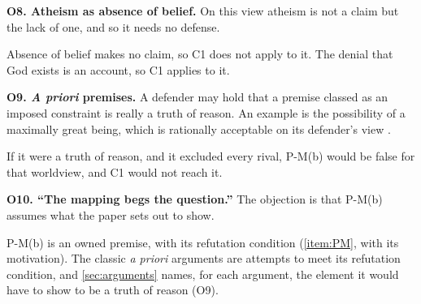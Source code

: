 \medskip\noindent\textbf{O8. Atheism as absence of belief.}\label{item:O8}
On this view atheism is not a claim but the lack of one, and so it needs no defense.

Absence of belief makes no claim, so C1 does not apply to it. The denial that God exists is an
account, so C1 applies to it.

\medskip\noindent\textbf{O9. \emph{A priori} premises.}\label{item:O9}
A defender may hold that a premise classed as an imposed constraint is really a truth of reason.
An example is the possibility of a maximally great being, which is rationally acceptable on its
defender's view \citep{plantinga1974}.

If it were a truth of reason, and it excluded every rival, P-M(b) would be false for that
worldview, and C1 would not reach it.

\medskip\noindent\textbf{O10. ``The mapping begs the question.''}\label{item:O10}
The objection is that P-M(b) assumes what the paper sets out to show.

P-M(b) is an owned premise, with its refutation condition (\cref{item:PM}, with its motivation). The classic \emph{a priori} arguments are
attempts to meet its refutation condition, and \cref{sec:arguments} names, for each argument, the
element it would have to show to be a truth of reason (O9).
